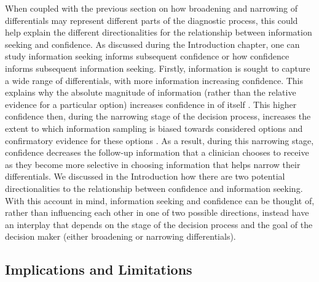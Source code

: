 \documentclass[a4paper, nobind]{templates/ociamthesis}
\begin{document}
When coupled with the previous section on how broadening and narrowing of differentials may represent different parts of the diagnostic process, this could help explain the different directionalities for the relationship between information seeking and confidence. As discussed during the Introduction chapter, one can study information seeking informs subsequent confidence or how confidence informs subsequent information seeking. Firstly, information is sought to capture a wide range of differentials, with more information increasing confidence. This explains why the absolute magnitude of information (rather than the relative evidence for a particular option) increases confidence in of itself \autocite{ko_divergent_2022}. This higher confidence then, during the narrowing stage of the decision process, increases the extent to which information sampling is biased towards considered options \autocite{kaanders_humans_2022} and confirmatory evidence for these options \autocite{rollwage_confidence_2020}. As a result, during this narrowing stage, confidence decreases the follow-up information that a clinician chooses to receive \autocite{meyer_physicians_2013} as they become more selective in choosing information that helps narrow their differentials. We discussed in the Introduction how there are two potential directionalities to the relationship between confidence and information seeking. With this account in mind, information seeking and confidence can be thought of, rather than influencing each other in one of two possible directions, instead have an interplay that depends on the stage of the decision process and the goal of the decision maker (either broadening or narrowing differentials).

\subsection{Implications and Limitations}\label{implications-and-limitations-1}
\end{document}
